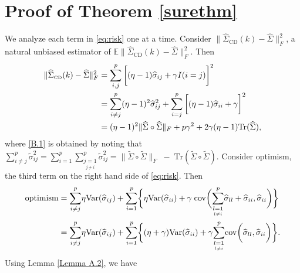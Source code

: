 \documentclass[11pt,oneside]{amsart}
\def\CD{{\mathrm{\scriptscriptstyle CD}}}
\begin{document}
\section{Proof of Theorem \ref{surethm}}
We analyze each term in \eqref{eq:risk} one at a time. Consider $\|\widehat{\Sigma}_{\CD}(k)  - {\widehat{\Sigma}}\|_{F}^{2}$, a natural unbiased estimator of ${\mathbb{E}}\|\widehat{\Sigma}_{\CD}(k)  - {\widehat{\Sigma}}\|_{F}^{2}$. Then 
\small\begin{align} \label{B.1}
\|\widehat{\Sigma}_{\CD}(k)  - {\widehat{\Sigma}}\|_{F}^{2} & = \displaystyle\sum\limits_{i,j}^{p}{\bigg[(\eta - 1){\widehat{\sigma}}_{ij} + {\gamma}I(i = j)\bigg]}^{2}  \notag \\
& = {\displaystyle\sum\limits_{i \ne j}^{p}}{(\eta - 1)^{2}{\widehat{\sigma}}_{ij}^{2}} + \displaystyle\sum\limits_{i=j}^{p}\bigg[(\eta - 1){\widehat{\sigma}}_{ii} + \gamma\bigg]^{2} \notag \\ 
& = (\eta - 1)^{2}\|{\widehat{\Sigma}} \circ {\widehat{\Sigma}} \|_{F} + p{\gamma^2} + 2{\gamma}(\eta - 1){\mbox{Tr}}({\widehat{\Sigma}}),
\end{align}
where \eqref{B.1} is obtained by noting that ${\displaystyle\sum\limits_{i\ne j}^{p}}{\widetilde{\sigma}}_{ij}^{2} = {\displaystyle\sum\limits_{i=1}^{p}}{\displaystyle\sum\limits_{\underset{j \ne i}{j = 1}}^{p}}{\widetilde{\sigma}}_{ij}^{2} = \|{\widetilde{\Sigma}}\circ{\widetilde{\Sigma}}\|_{F} \;- \;\mbox{Tr}({\widetilde{\Sigma}}\circ{\widetilde{\Sigma}})$. Consider optimism, the third term on the right hand side of \eqref{eq:risk}. Then 
\begin{align} \label{B.2}
{\text{optimism}} & = {\displaystyle\sum\limits_{i \ne j}^{p}} {\eta}{\mbox{Var}}({\widehat{\sigma}}_{ij}) + {\displaystyle\sum\limits_{i = 1}^{p}}\bigg\{\eta{\mbox{Var}}({\widehat{\sigma}}_{ii}) + \gamma\;{\mbox{cov}}\bigg({\displaystyle\sum\limits_{\underset{l \ne i}{l = 1}}^{p}}{\widehat{\sigma}}_{ll} + {\widehat{\sigma}}_{ii}, {\widehat{\sigma}}_{ii}\bigg)\bigg\} \notag \\
& = {\displaystyle\sum\limits_{i \ne j}^{p}} {\eta}{\mbox{Var}}({\widehat{\sigma}}_{ij}) + {\displaystyle\sum\limits_{i = 1}^{p}}\bigg\{(\eta + \gamma){\mbox{Var}}({\widehat{\sigma}}_{ii}) + \gamma{\displaystyle\sum\limits_{\underset{l \ne i}{l = 1}}^{p}}{\mbox{cov}}\bigg({\widehat{\sigma}}_{ll}, {\widehat{\sigma}}_{ii}\bigg)\bigg\}.
\end{align}
Using Lemma \ref{Lemma A.2}, we have 
\end{document}
